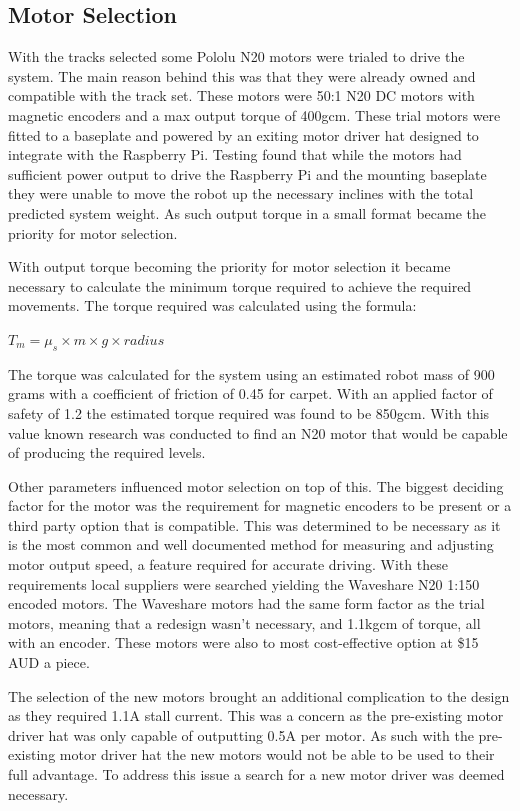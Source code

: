 \documentclass{article}
\begin{document}
\subsection{Motor Selection}
With the tracks selected some Pololu N20 motors were trialed to drive the system. The main reason behind this was that they were already owned and compatible with the
track set. These motors were 50:1 N20 DC motors with magnetic encoders and a max output torque of 400gcm. These trial motors were fitted to a baseplate and powered by
an exiting motor driver hat designed to integrate with the Raspberry Pi. Testing found that while the motors had sufficient power output to drive the Raspberry Pi and
the mounting baseplate they were unable to move the robot up the necessary inclines with the total predicted system weight. As such output torque in a small format
became the priority for motor selection.
\par
With output torque becoming the priority for motor selection it became necessary to calculate the minimum torque required to achieve the required movements. The torque
required was calculated using the formula:
\begin{center}
\begin{math} 
    T_m = \mu_s \times m\times g \times radius
\end{math}
\end{center} 
The torque was calculated for the system using an estimated robot mass of 900 grams with a coefficient of friction of 0.45 for carpet. With an applied factor of safety of
1.2 the estimated torque required was found to be 850gcm. With this value known research was conducted to find an N20 motor that would be capable of producing the required
levels.
\par
Other parameters influenced motor selection on top of this. The biggest deciding factor for the motor was the requirement for magnetic encoders to be present or a third
party option that is compatible. This was determined to be necessary as it is the most common and well documented method for measuring and adjusting motor output speed,
a feature required for accurate driving. With these requirements local suppliers were searched yielding the Waveshare N20 1:150 encoded motors. The Waveshare motors
had the same form factor as the trial motors, meaning that a redesign wasn't necessary, and 1.1kgcm of torque, all with an encoder. These motors were also to most
cost-effective option at \$15 AUD a piece.
\par
The selection of the new motors brought an additional complication to the design as they required 1.1A stall current. This was a concern as the pre-existing motor driver
hat was only capable of outputting 0.5A per motor. As such with the pre-existing motor driver hat the new motors would not be able to be used to their full advantage.
To address this issue a search for a new motor driver was deemed necessary.
\end{document}
